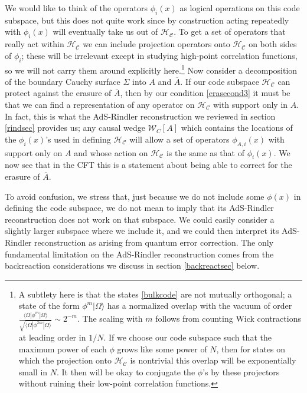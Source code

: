 \documentclass[11pt]{article}
\newcommand{\HC}{\mathcal{H}_{\mathcal{C}}}
\newcommand{\lan}{\langle}
\newcommand{\ran}{\rangle}
\newcommand{\W}{\mathcal{W}}
\newcommand{\ol}{\overline}
\begin{document}
We would like to think of the operators $\phi_i(x)$ as logical operations on this code subspace, but this does not quite work since by construction acting repeatedly with $\phi_i(x)$ will eventually take us out of $\HC$.  To get a set of operators that really act within $\HC$ we can include projection operators onto $\HC$ on both sides of $\phi_i$; these will be irrelevant except in studying high-point correlation functions, so we will not carry them around explicitly here.\footnote{A subtlety here is that the states \eqref{bulkcode} are not mutually orthogonal; a state of the form $\phi^m|\Omega\ran$ has a normalized overlap with the vacuum of order $\frac{\lan\Omega|\phi^m|\Omega\ran}{\sqrt{\lan\Omega|\phi^{2m}|\Omega\ran}}\sim 2^{-m}$.  The scaling with $m$ follows from counting Wick contractions at leading order in $1/N$.  If we choose our code subspace such that the maximum power of each $\phi$ grows like some power of $N$, then for states on which the projection onto $\HC$ is nontrivial this overlap will be exponentially small in $N$.  It then will be okay to conjugate the $\phi$'s by these projectors without ruining their low-point correlation functions.}  Now consider a decomposition of the boundary Cauchy surface $\Sigma$ into $A$ and $\ol{A}$.  If our code subspace $\HC$ can protect against the erasure of $\ol{A}$, then by our condition \eqref{erasecond3} it must be that we can find a representation of any operator on $\HC$ with support only in $A$.  In fact, this is what the AdS-Rindler reconstruction we reviewed in section \ref{rindsec} provides us; any causal wedge $\W_C[A]$ which contains the locations of the $\phi_i(x)$'s used in defining $\HC$ will allow a set of operators $\phi_{A,i}(x)$ with support only on $A$ and whose action on $\HC$ is the same as that of $\phi_{i}(x)$.  We now see that in the CFT this is a statement about being able to correct for the erasure of $\overline{A}$.

To avoid confusion, we stress that, just because we do not include some $\phi(x)$ in defining the code subspace, we do not mean to imply that its AdS-Rindler reconstruction does not work on that subspace.  We could easily consider a slightly larger subspace where we include it, and we could then interpret its AdS-Rindler reconstruction as arising from quantum error correction.  The only fundamental limitation on the AdS-Rindler reconstruction comes from the backreaction considerations we discuss in section \ref{backreactsec} below.
\end{document}
